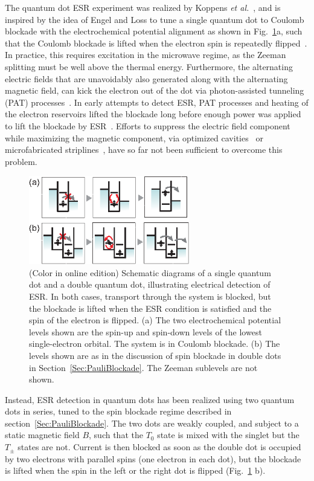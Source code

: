 \documentclass[12pt,aps,nofootinbib]{revtex4-1}
\begin{document}
The quantum dot ESR experiment was realized by Koppens \textit{et al.}~\cite{koppens06}, and is inspired by the idea of Engel and Loss to tune a single quantum dot to Coulomb blockade with the electrochemical potential alignment as
shown in Fig.~\ref{fig:ESR_detection}a, such that the Coulomb
blockade is lifted when the electron spin is repeatedly flipped~\cite{engel01,engel02}.
In practice, this requires excitation in the microwave regime, as
the Zeeman splitting must be well above the thermal energy.
Furthermore, the alternating electric fields that are unavoidably
also generated along with the alternating magnetic field, can kick
the electron out of the dot via photon-assisted tunneling (PAT)
processes~\cite{platero04}. In early attempts to detect ESR, PAT
processes and heating of the electron reservoirs lifted the
blockade long before enough power was applied to lift the blockade
by ESR~\cite{HansonThesis2005}. Efforts to suppress the electric
field component while maximizing the magnetic component, via
optimized cavities~\cite{simovic06} or microfabricated
striplines~\cite{koppens06}, have so far not been sufficient to
overcome this problem.

\begin{figure}[htb]
\includegraphics[width=7cm]{hanson_fig42.eps}
\caption{(Color in online edition) Schematic diagrams of a single quantum dot and a double
quantum dot, illustrating electrical detection of ESR. In both
cases, transport through the system is blocked, but the blockade
is lifted when the ESR condition is satisfied and the spin of the
electron is flipped. (a) The two electrochemical potential levels
shown are the spin-up and spin-down levels of the lowest
single-electron orbital. The system is in Coulomb blockade. (b)
The levels shown are as in the discussion of spin blockade in
double dots in Section~\ref{Sec:PauliBlockade}. The Zeeman
sublevels are not shown.} \label{fig:ESR_detection}
\end{figure}

Instead, ESR detection in quantum dots has been realized using two
quantum dots in series, tuned to the spin blockade regime described in
section~\ref{Sec:PauliBlockade}. The two dots are weakly coupled,
and subject to a static magnetic field $B$, such that the $T_{0}$
state is mixed with the singlet but the $T_{\pm}$ states are not.
Current is then blocked as soon as the double dot is occupied by
two electrons with parallel spins (one electron in each dot), but
the blockade is lifted when the spin in the left or the right dot
is flipped (Fig.~\ref{fig:ESR_detection} b).
\end{document}

